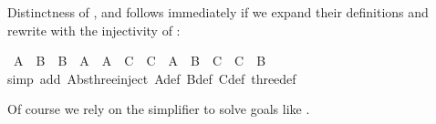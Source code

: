 \begin{isabellebody}
\begin{isamarkuptext}
Distinctness of ,  and  follows immediately
if we expand their definitions and rewrite with the injectivity
of :%
\end{isamarkuptext}%
\isamarkuptrue%
\isamarkupfalse%
\ {}A\ {}\ B\ {}\ B\ {}\ A\ {}\ A\ {}\ C\ {}\ C\ {}\ A\ {}\ B\ {}\ C\ {}\ C\ {}\ B{}\isanewline
%
\isadelimproof
%
\endisadelimproof
%
\isatagproof
{}\isamarkupfalse%
{}simp\ add{}\ Abs{}three{}inject\ A{}def\ B{}def\ C{}def\ three{}def{}%
\endisatagproof
{\isafoldproof}%
%
\isadelimproof
%
\endisadelimproof
%
\begin{isamarkuptext}%
\noindent
Of course we rely on the simplifier to solve goals like .


\end{isamarkuptext}
\end{isabellebody}
